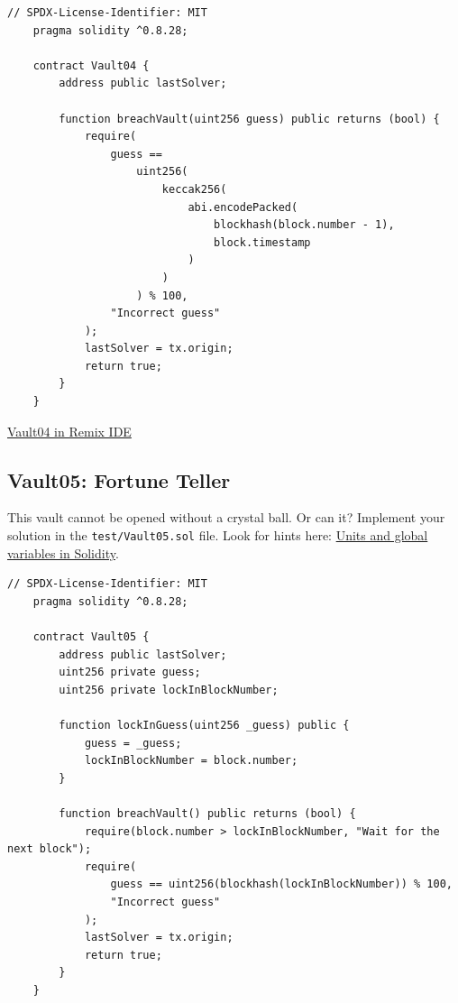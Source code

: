 \documentclass[12pt]{article}
\begin{document}
\begin{lstlisting}[language=Solidity]
    // SPDX-License-Identifier: MIT
    pragma solidity ^0.8.28;
    
    contract Vault04 {
        address public lastSolver;
    
        function breachVault(uint256 guess) public returns (bool) {
            require(
                guess ==
                    uint256(
                        keccak256(
                            abi.encodePacked(
                                blockhash(block.number - 1),
                                block.timestamp
                            )
                        )
                    ) % 100,
                "Incorrect guess"
            );
            lastSolver = tx.origin;
            return true;
        }
    }
\end{lstlisting}

\medskip
\noindent
\href{https://remix.ethereum.org/?#activate=solidity&url=https://github.com/radovluk/unbreakable-vault/contracts/Vault04.sol&lang=en&optimize=false&runs=200&evmVersion=null&version=soljson-v0.8.28+commit.7893614a.js}{Vault04 in Remix IDE}

\subsection*{Vault05: Fortune Teller}

This vault cannot be opened without a crystal ball. Or can it? Implement your solution in the \texttt{test/Vault05.sol} file. Look for hints here: \href{https://docs.soliditylang.org/en/latest/units-and-global-variables.html}{Units and global variables in Solidity}.

\begin{lstlisting}[language=Solidity]
    // SPDX-License-Identifier: MIT
    pragma solidity ^0.8.28;
    
    contract Vault05 {
        address public lastSolver;
        uint256 private guess;
        uint256 private lockInBlockNumber;
    
        function lockInGuess(uint256 _guess) public {
            guess = _guess;
            lockInBlockNumber = block.number;
        }
    
        function breachVault() public returns (bool) {
            require(block.number > lockInBlockNumber, "Wait for the next block");
            require(
                guess == uint256(blockhash(lockInBlockNumber)) % 100,
                "Incorrect guess"
            );
            lastSolver = tx.origin;
            return true;
        }
    }
    
\end{lstlisting}
\end{document}
